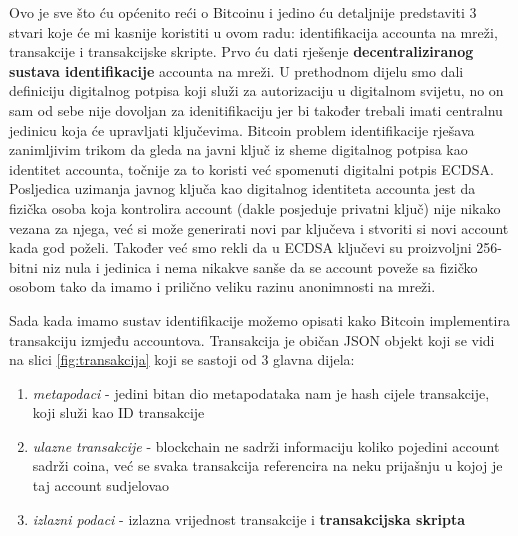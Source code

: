 \documentclass[12pt]{report}
\begin{document}
Ovo je sve što ću općenito reći o Bitcoinu i jedino ću detaljnije predstaviti 3 stvari koje će mi kasnije koristiti u ovom radu: identifikacija accounta na mreži, transakcije i transakcijske skripte. Prvo ću dati rješenje \textbf{decentraliziranog sustava identifikacije} accounta na mreži. U prethodnom dijelu smo dali definiciju digitalnog potpisa koji služi za autorizaciju u digitalnom svijetu, no on sam od sebe nije dovoljan za idenitifikaciju jer bi također trebali imati centralnu jedinicu koja će upravljati ključevima. Bitcoin problem identifikacije rješava zanimljivim trikom da gleda na javni ključ iz sheme digitalnog potpisa kao identitet accounta, točnije za to koristi već spomenuti digitalni potpis ECDSA. Posljedica uzimanja javnog ključa kao digitalnog identiteta accounta jest da fizička osoba koja kontrolira account (dakle posjeduje privatni ključ) nije nikako vezana za njega, već si može generirati novi par ključeva i stvoriti si novi account kada god poželi. Također već smo rekli da u ECDSA ključevi su proizvoljni 256-bitni niz nula i jedinica i nema nikakve sanše da se account poveže sa fizičko osobom tako da imamo i prilično veliku razinu anonimnosti na mreži.

Sada kada imamo sustav identifikacije možemo opisati kako Bitcoin implementira transakciju izmjeđu accountova. Transakcija je običan JSON objekt koji se vidi na slici \ref{fig:transakcija} koji se sastoji od 3 glavna dijela:
\begin{enumerate}
    \item \textit{metapodaci} - jedini bitan dio metapodataka nam je hash cijele transakcije, koji služi kao ID transakcije
    \item\textit{ulazne transakcije} - blockchain ne sadrži informaciju koliko pojedini account sadrži coina, već se svaka transakcija referencira na neku prijašnju u kojoj je taj account sudjelovao
    \item \textit{izlazni podaci} - izlazna vrijednost transakcije i \textbf{transakcijska skripta}
\end{enumerate}
\end{document}
